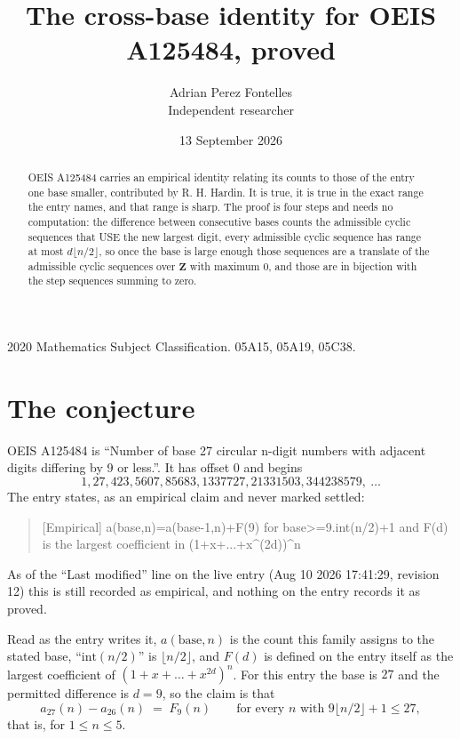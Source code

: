 \documentclass[11pt,a4paper]{article}
\title{The cross-base identity for OEIS A125484, proved}
\author{Adrian Perez Fontelles\\ \small Independent researcher}
\date{13 September 2026}
\theoremstyle{plain}
\theoremstyle{definition}
\begin{document}
\maketitle

\begin{abstract}
OEIS A125484 carries an empirical identity relating its counts to those of the entry one base
smaller, contributed by R. H. Hardin. It is true, it is true in the exact range the entry
names, and that range is sharp. The proof is four steps and needs no computation: the
difference between consecutive bases counts the admissible cyclic sequences that USE the new
largest digit, every admissible cyclic sequence has range at most $d\lfloor n/2\rfloor$, so
once the base is large enough those sequences are a translate of the admissible cyclic
sequences over $\mathbf{Z}$ with maximum $0$, and those are in bijection with the step
sequences summing to zero.
\end{abstract}

\noindent\small 2020 Mathematics Subject Classification. 05A15, 05A19, 05C38.\normalsize

\section{The conjecture}

OEIS A125484 is ``Number of base 27 circular n-digit numbers with adjacent digits differing by 9 or less.''. It has offset $0$ and begins
\[
1, 27, 423, 5607, 85683, 1337727, 21331503, 344238579,\ \dots
\]
The entry states, as an empirical claim and never marked settled:
\begin{quote}
[Empirical] a(base,n)=a(base-1,n)+F(9) for base>=9.int(n/2)+1 and F(d) is the largest coefficient in (1+x+...+x\textasciicircum{}(2d))\textasciicircum{}n
\end{quote}
As of the ``Last modified'' line on the live entry (Aug 10 2026 17:41:29, revision 12)
this is still recorded as empirical, and nothing on the entry records it as proved.

Read as the entry writes it, $a(\mathrm{base},n)$ is the count this family assigns to the
stated base, ``$\mathrm{int}(n/2)$'' is $\lfloor n/2\rfloor$, and $F(d)$ is defined on the
entry itself as the largest coefficient of $(1+x+\dots+x^{2d})^{n}$. For this entry
the base is $27$ and the permitted difference is $d=9$, so the claim is that
\[
a_{27}(n)-a_{26}(n)\;=\;F_{9}(n)
\qquad\text{for every } n \text{ with } 9\lfloor n/2\rfloor+1\le27,
\]
that is, for $1\le n\le5$.
\end{document}
